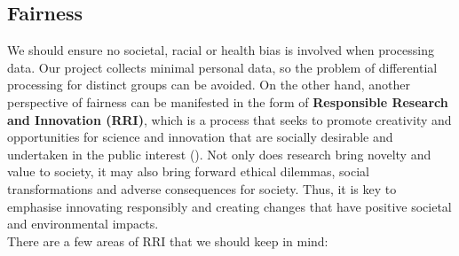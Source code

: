 \subsection{Fairness}
We should ensure no societal, racial or health bias is involved when processing data. Our project collects minimal personal data, so the problem of differential processing for distinct groups can be avoided. 
On the other hand, another perspective of fairness can be manifested in the form of \textbf{Responsible Research and Innovation (RRI)}, which is a process that seeks to promote creativity and opportunities 
for science and innovation that are socially desirable and undertaken in the public interest (\cite{ukri}). Not only does research bring novelty 
and value to society, it may also bring forward ethical dilemmas, social transformations and adverse consequences for society. Thus, it is key to emphasise innovating responsibly and creating changes that
have positive societal and environmental impacts.\\ There are a few areas of RRI that we should keep in mind:
